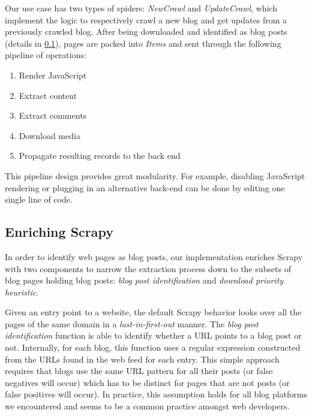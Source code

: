 Our use case has two types of spiders: \emph{NewCrawl} and \emph{UpdateCrawl}, which implement the logic to respectively crawl a new blog and get updates from a previously crawled blog. After being downloaded and identified as blog posts (details in \ref{enrichingscrapy}), pages are packed into \emph{Items} and sent through the following pipeline of operations:
\begin{enumerate}[noitemsep]
  \item Render JavaScript
  \item Extract content
  \item Extract comments
  \item Download media
  \item Propagate resulting records to the back end
\end{enumerate}
This pipeline design provides great modularity. For example, disabling JavaScript rendering or plugging in an alternative back-end can be done by editing one single line of code.


\subsection{Enriching Scrapy}\label{enrichingscrapy}
In order to identify web pages as blog posts, our implementation enriches Scrapy with two components to narrow the extraction process down to the subsets of blog pages holding blog posts: \emph{blog post identification} and \emph{download priority heuristic}.

Given an entry point to a website, the default Scrapy behavior looks over all the pages of the same domain in a \emph{last-in-first-out} manner. The \emph{blog post identification} function is able to identify whether a URL points to a blog post or not. Internally, for each blog, this function uses a regular expression constructed from the URLs found in the web feed for each entry. This simple approach requires that blogs use the same URL pattern for all their posts (or false negatives will occur) which has to be distinct for pages that are not posts (or false positives will occur). In practice, this assumption holds for all blog platforms we encountered and seems to be a common practice amongst web developers.

